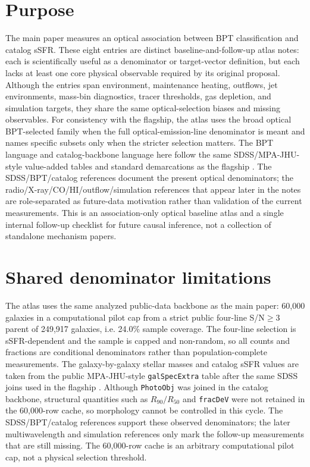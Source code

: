 \documentclass[twocolumn]{aastex631}
\begin{document}
\section{Purpose}
The main paper measures an optical association between BPT classification and catalog sSFR. These eight entries are distinct baseline-and-follow-up atlas notes: each is scientifically useful as a denominator or target-vector definition, but each lacks at least one core physical observable required by its original proposal. Although the entries span environment, maintenance heating, outflows, jet environments, mass-bin diagnostics, tracer thresholds, gas depletion, and simulation targets, they share the same optical-selection biases and missing observables. For consistency with the flagship, the atlas uses the broad optical BPT-selected family when the full optical-emission-line denominator is meant and names specific subsets only when the stricter selection matters. The BPT language and catalog-backbone language here follow the same SDSS/MPA-JHU-style value-added tables and standard demarcations as the flagship \citep{sdssdr17,brinchmann2004,york2000,baldwin1981,kewley2001,kauffmann2003bpt,kewley2006,stasinska2008,stasinska2015}. The SDSS/BPT/catalog references document the present optical denominators; the radio/X-ray/CO/HI/outflow/simulation references that appear later in the notes are role-separated as future-data motivation rather than validation of the current measurements. This is an association-only optical baseline atlas and a single internal follow-up checklist for future causal inference, not a collection of standalone mechanism papers.

\section{Shared denominator limitations}
The atlas uses the same analyzed public-data backbone as the main paper: 60,000 galaxies in a computational pilot cap from a strict public four-line S/N$\geq3$ parent of 249,917 galaxies, i.e. 24.0\% sample coverage. The four-line selection is sSFR-dependent and the sample is capped and non-random, so all counts and fractions are conditional denominators rather than population-complete measurements. The galaxy-by-galaxy stellar masses and catalog sSFR values are taken from the public MPA-JHU-style \texttt{galSpecExtra} table after the same SDSS joins used in the flagship \citep{sdssdr17,brinchmann2004,york2000}. Although \texttt{PhotoObj} was joined in the catalog backbone, structural quantities such as \(R_{90}/R_{50}\) and \texttt{fracDeV} were not retained in the 60,000-row cache, so morphology cannot be controlled in this cycle. The SDSS/BPT/catalog references support these observed denominators; the later multiwavelength and simulation references only mark the follow-up measurements that are still missing. The 60,000-row cache is an arbitrary computational pilot cap, not a physical selection threshold.
\end{document}
